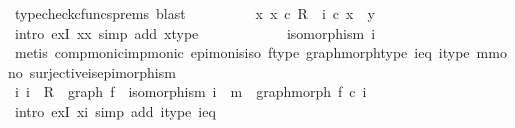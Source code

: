 \begin{isabellebody}
\ {\isacharparenleft}{\kern0pt}typecheck{\isacharunderscore}{\kern0pt}cfuncs{\isacharunderscore}{\kern0pt}prems{\isacharcomma}{\kern0pt}\ blast{\isacharparenright}{\kern0pt}\isanewline
\ \ \ \ \ \ \isamarkupfalse%
\ \isamarkupfalse%
\ {\isachardoublequoteopen}{\isasymexists}x{\isacharprime}{\kern0pt}{\isachardot}{\kern0pt}\ x{\isacharprime}{\kern0pt}\ {\isasymin}\isactrlsub c\ R\ {\isasymand}\ i\ {\isasymcirc}\isactrlsub c\ x{\isacharprime}{\kern0pt}\ {\isacharequal}{\kern0pt}\ y{\isacharprime}{\kern0pt}{\isachardoublequoteclose}\isanewline
\ \ \ \ \ \ \ \ \isamarkupfalse%
\ {\isacharparenleft}{\kern0pt}intro\ exI{\isacharbrackleft}{\kern0pt}\ x{\isacharequal}{\kern0pt}x{\isacharprime}{\kern0pt}{\isacharbrackright}{\kern0pt}{\isacharcomma}{\kern0pt}\ simp\ add{\isacharcolon}{\kern0pt}\ x{\isacharprime}{\kern0pt}{\isacharunderscore}{\kern0pt}type{\isacharparenright}{\kern0pt}\isanewline
\ \ \ \ \isamarkupfalse%
\isanewline
\ \ \ \ \isamarkupfalse%
\ \isamarkupfalse%
\ {\isachardoublequoteopen}isomorphism\ i{\isachardoublequoteclose}\isanewline
\ \ \ \ \ \ \isamarkupfalse%
\ {\isacharparenleft}{\kern0pt}metis\ comp{\isacharunderscore}{\kern0pt}monic{\isacharunderscore}{\kern0pt}imp{\isacharunderscore}{\kern0pt}monic{\isacharprime}{\kern0pt}\ epi{\isacharunderscore}{\kern0pt}mon{\isacharunderscore}{\kern0pt}is{\isacharunderscore}{\kern0pt}iso\ f{\isacharunderscore}{\kern0pt}type\ graph{\isacharunderscore}{\kern0pt}morph{\isacharunderscore}{\kern0pt}type\ i{\isacharunderscore}{\kern0pt}eq\ i{\isacharunderscore}{\kern0pt}type\ m{\isacharunderscore}{\kern0pt}mono\ surjective{\isacharunderscore}{\kern0pt}is{\isacharunderscore}{\kern0pt}epimorphism{\isacharparenright}{\kern0pt}\isanewline
\ \ \ \ \isamarkupfalse%
\ \isamarkupfalse%
\ {\isachardoublequoteopen}{\isasymexists}i{\isachardot}{\kern0pt}\ i\ {\isacharcolon}{\kern0pt}\ R\ {\isasymrightarrow}\ graph\ f\ {\isasymand}\ isomorphism\ i\ {\isasymand}\ m\ {\isacharequal}{\kern0pt}\ graph{\isacharunderscore}{\kern0pt}morph\ f\ {\isasymcirc}\isactrlsub c\ i{\isachardoublequoteclose}\isanewline
\ \ \ \ \ \ \isamarkupfalse%
\ {\isacharparenleft}{\kern0pt}intro\ exI{\isacharbrackleft}{\kern0pt}\ x{\isacharequal}{\kern0pt}i{\isacharbrackright}{\kern0pt}{\isacharcomma}{\kern0pt}\ simp\ add{\isacharcolon}{\kern0pt}\ i{\isacharunderscore}{\kern0pt}type\ i{\isacharunderscore}{\kern0pt}eq{\isacharparenright}{\kern0pt}\isanewline

\end{isabellebody}
